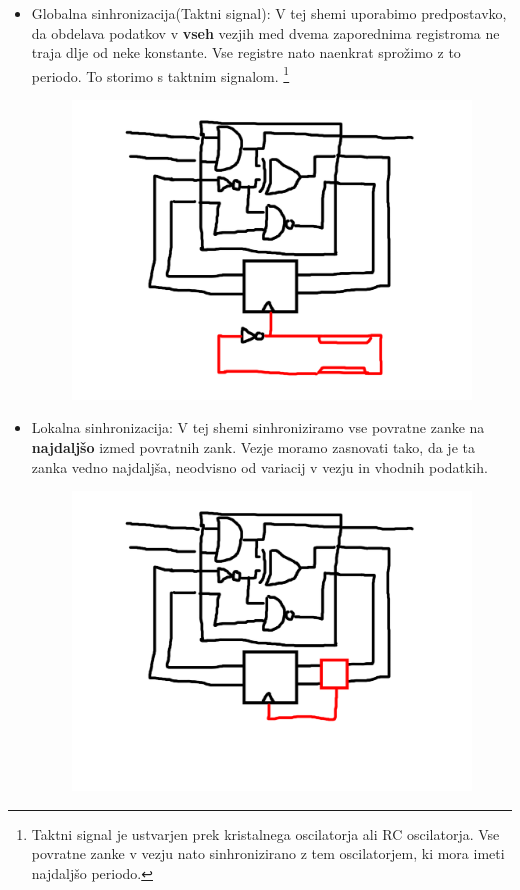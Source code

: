 \begin{itemize}
	\item Globalna sinhronizacija(Taktni signal):
	V tej shemi uporabimo predpostavko, da obdelava podatkov v \textbf{vseh} vezjih med dvema zaporednima registroma ne traja dlje od neke konstante. Vse registre nato naenkrat sprožimo z to periodo. To storimo s taktnim signalom.	 \footnote{Taktni signal je ustvarjen prek kristalnega oscilatorja ali RC oscilatorja. Vse povratne zanke v vezju nato sinhronizirano z tem oscilatorjem, ki mora imeti najdaljšo periodo.}
	\begin{figure}[H]
		\centering
		\includegraphics[width=0.7\linewidth]{slike/uvod/seq}
		\caption{}
		\label{fig:comb}
	\end{figure}
	
	
	
	
	\item Lokalna sinhronizacija:
	V tej shemi sinhroniziramo vse povratne zanke na \textbf{najdaljšo} izmed povratnih zank. Vezje moramo zasnovati tako, da je ta zanka vedno najdaljša, neodvisno od variacij v vezju in vhodnih podatkih.
	
	\begin{figure}[H]
		\centering
		\includegraphics[width=0.7\linewidth]{slike/uvod/async}
		\caption{}
		\label{fig:comb}
	\end{figure}
	
\end{itemize}


	

	

	





	
